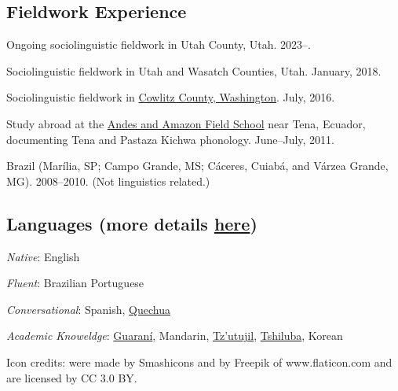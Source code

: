 \documentclass[
]{article}
\begin{document}
\hypertarget{fieldwork-experience}{%
\subsection{Fieldwork Experience}\label{fieldwork-experience}}

Ongoing sociolinguistic fieldwork in Utah County, Utah. 2023--.

Sociolinguistic fieldwork in Utah and Wasatch Counties, Utah. January,
2018.

Sociolinguistic fieldwork in
\href{https://en.wikipedia.org/wiki/Cowlitz_County,_Washington}{Cowlitz
County, Washington}. July, 2016.

Study abroad at the
\href{http://www.andes-fieldschool.org/Andes_and_Amazon_Field_School/Home.html}{Andes
and Amazon Field School} near Tena, Ecuador, documenting Tena and
Pastaza Kichwa phonology. June--July, 2011.

Brazil (Marília, SP; Campo Grande, MS; Cáceres, Cuiabá, and Várzea
Grande, MG). 2008--2010. (Not linguistics related.)

\hypertarget{languages-more-details-here}{%
\subsection{\texorpdfstring{Languages (more details
\href{/blog/stories-behind-the-languages-ive-studied}{here})}{Languages (more details here)}}\label{languages-more-details-here}}

\emph{Native}: English

\emph{Fluent}: Brazilian Portuguese

\emph{Conversational}: Spanish,
\href{https://en.wikipedia.org/wiki/Quechuan_languages}{Quechua}

\emph{Academic Knoweldge}:
\href{https://en.wikipedia.org/wiki/Guarani_language}{Guaraní},
Mandarin,
\href{https://en.wikipedia.org/wiki/Tz’utujil_language}{Tz'utujil},
\href{https://en.wikipedia.org/wiki/Luba-Kasai_language}{Tshiluba},
Korean

{ Icon credits: were made by Smashicons and by Freepik of
www.flaticon.com and are licensed by CC 3.0 BY. }
\end{document}
